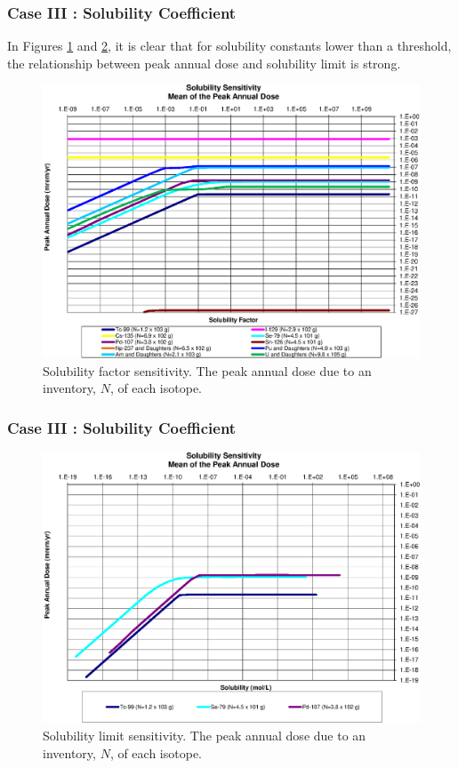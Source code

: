 \begin{frame}[c]
  \frametitle{Case III : Solubility Coefficient}

In Figures \ref{fig:SolSumFactor} and \ref{fig:SolSum}, it is clear that for 
solubility constants lower than a threshold, the relationship between peak 
annual dose and solubility limit is strong.

\begin{figure}[ht]
\centering
\includegraphics[width=\linewidth]{Solubility/Solubility_Summary_SolFactor.eps}
\caption{Solubility factor sensitivity. The peak annual dose due to an inventory, 
$N$, of each isotope.}
\label{fig:SolSumFactor}
\end{figure}
\end{frame}

\begin{frame}[c]
  \frametitle{Case III : Solubility Coefficient}

\begin{figure}[ht]
\centering
\includegraphics[width=\linewidth]{Solubility/Solubility_Summary_Sol.eps}
\caption{Solubility limit sensitivity. The peak annual dose due to an inventory, 
$N$, of each isotope.}
\label{fig:SolSum}
\end{figure}
\end{frame}

